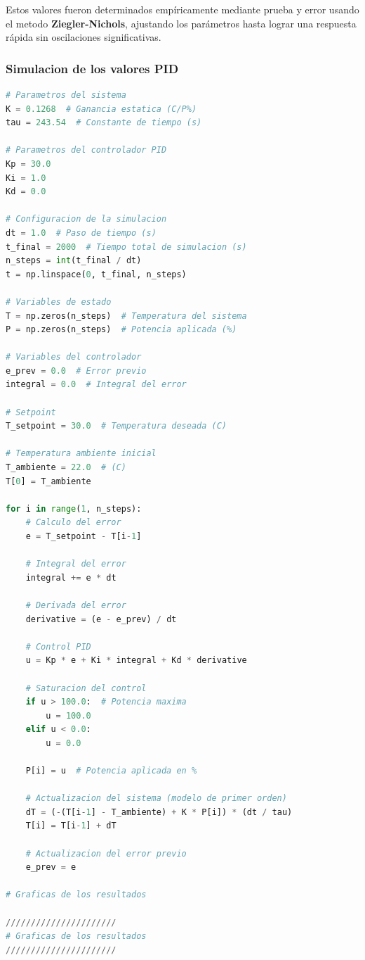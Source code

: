 \documentclass[spanish, a4paper, 11pt]{article}
\begin{document}
Estos valores fueron determinados empíricamente mediante prueba y error usando el metodo \textbf{Ziegler-Nichols}, ajustando los parámetros hasta lograr una respuesta rápida sin oscilaciones significativas.

\subsubsection{Simulacion de los valores PID}

\begin{lstlisting}[language=Python]
    # Parametros del sistema
K = 0.1268  # Ganancia estatica (C/P%)
tau = 243.54  # Constante de tiempo (s)

# Parametros del controlador PID
Kp = 30.0
Ki = 1.0
Kd = 0.0

# Configuracion de la simulacion
dt = 1.0  # Paso de tiempo (s)
t_final = 2000  # Tiempo total de simulacion (s)
n_steps = int(t_final / dt)
t = np.linspace(0, t_final, n_steps)

# Variables de estado
T = np.zeros(n_steps)  # Temperatura del sistema
P = np.zeros(n_steps)  # Potencia aplicada (%)

# Variables del controlador
e_prev = 0.0  # Error previo
integral = 0.0  # Integral del error

# Setpoint
T_setpoint = 30.0  # Temperatura deseada (C)

# Temperatura ambiente inicial
T_ambiente = 22.0  # (C)
T[0] = T_ambiente

for i in range(1, n_steps):
    # Calculo del error
    e = T_setpoint - T[i-1]
    
    # Integral del error
    integral += e * dt
    
    # Derivada del error
    derivative = (e - e_prev) / dt
    
    # Control PID
    u = Kp * e + Ki * integral + Kd * derivative
    
    # Saturacion del control
    if u > 100.0:  # Potencia maxima
        u = 100.0
    elif u < 0.0:
        u = 0.0
    
    P[i] = u  # Potencia aplicada en %
    
    # Actualizacion del sistema (modelo de primer orden)
    dT = (-(T[i-1] - T_ambiente) + K * P[i]) * (dt / tau)
    T[i] = T[i-1] + dT
    
    # Actualizacion del error previo
    e_prev = e

# Graficas de los resultados

//////////////////////
# Graficas de los resultados
//////////////////////

\end{lstlisting}
\end{document}
